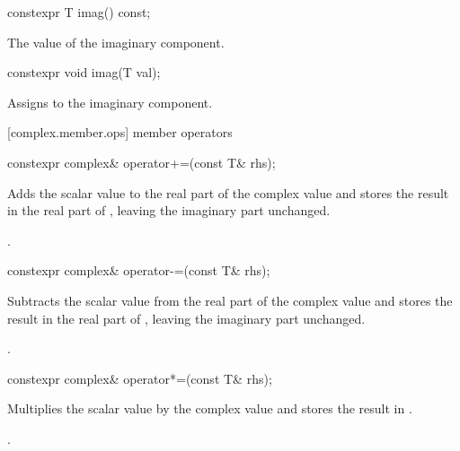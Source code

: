 %
\begin{itemdecl}
constexpr T imag() const;
\end{itemdecl}

\begin{itemdescr}
\pnum
\returns The value of the imaginary component.
\end{itemdescr}

%
\begin{itemdecl}
constexpr void imag(T val);
\end{itemdecl}

\begin{itemdescr}
\pnum
\effects Assigns  to the imaginary component.
\end{itemdescr}

[complex.member.ops]{ member operators}

%
\begin{itemdecl}
constexpr complex& operator+=(const T& rhs);
\end{itemdecl}

\begin{itemdescr}
\pnum
\effects
Adds the scalar value  to the real part of the complex value
and stores the result in the real part of
,
leaving the imaginary part unchanged.

\pnum
\returns
{}.
\end{itemdescr}

%
\begin{itemdecl}
constexpr complex& operator-=(const T& rhs);
\end{itemdecl}

\begin{itemdescr}
\pnum
\effects
Subtracts the scalar value  from the real part of the complex value
and stores the result in the real part of
,
leaving the imaginary part unchanged.

\pnum
\returns
{}.
\end{itemdescr}

%
\begin{itemdecl}
constexpr complex& operator*=(const T& rhs);
\end{itemdecl}

\begin{itemdescr}
\pnum
\effects
Multiplies the scalar value  by the complex value
and stores the result in
.

\pnum
\returns
{}.
\end{itemdescr}

